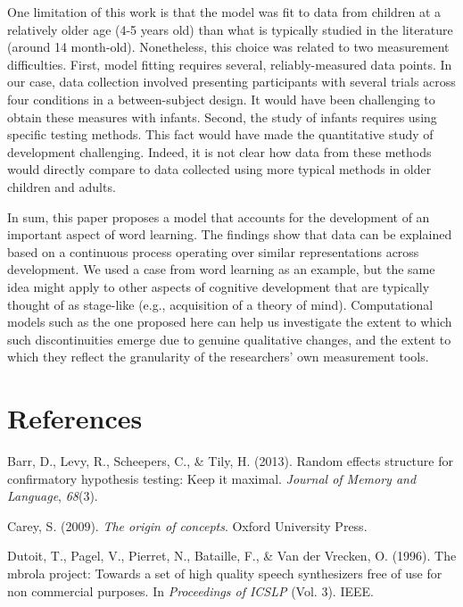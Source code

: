 \documentclass[10pt, letterpaper]{article}
\begin{document}
One limitation of this work is that the model was fit to data from
children at a relatively older age (4-5 years old) than what is
typically studied in the literature (around 14 month-old). Nonetheless,
this choice was related to two measurement difficulties. First, model
fitting requires several, reliably-measured data points. In our case,
data collection involved presenting participants with several trials
across four conditions in a between-subject design. It would have been
challenging to obtain these measures with infants. Second, the study of
infants requires using specific testing methods. This fact would have
made the quantitative study of development challenging. Indeed, it is
not clear how data from these methods would directly compare to data
collected using more typical methods in older children and adults.

In sum, this paper proposes a model that accounts for the development of
an important aspect of word learning. The findings show that data can be
explained based on a continuous process operating over similar
representations across development. We used a case from word learning as
an example, but the same idea might apply to other aspects of cognitive
development that are typically thought of as stage-like (e.g.,
acquisition of a theory of mind). Computational models such as the one
proposed here can help us investigate the extent to which such
discontinuities emerge due to genuine qualitative changes, and the
extent to which they reflect the granularity of the researchers' own
measurement tools.

\section{References}\label{references}

\setlength{\parindent}{-0.1in} \setlength{\leftskip}{0.125in} \noindent

\hypertarget{refs}{}
\hypertarget{ref-barr2013}{}
Barr, D., Levy, R., Scheepers, C., \& Tily, H. (2013). Random effects
structure for confirmatory hypothesis testing: Keep it maximal.
\emph{Journal of Memory and Language}, \emph{68}(3).

\hypertarget{ref-carey2009}{}
Carey, S. (2009). \emph{The origin of concepts}. Oxford University
Press.

\hypertarget{ref-dutoit1996}{}
Dutoit, T., Pagel, V., Pierret, N., Bataille, F., \& Van der Vrecken, O.
(1996). The mbrola project: Towards a set of high quality speech
synthesizers free of use for non commercial purposes. In
\emph{Proceedings of ICSLP} (Vol. 3). IEEE.
\end{document}
